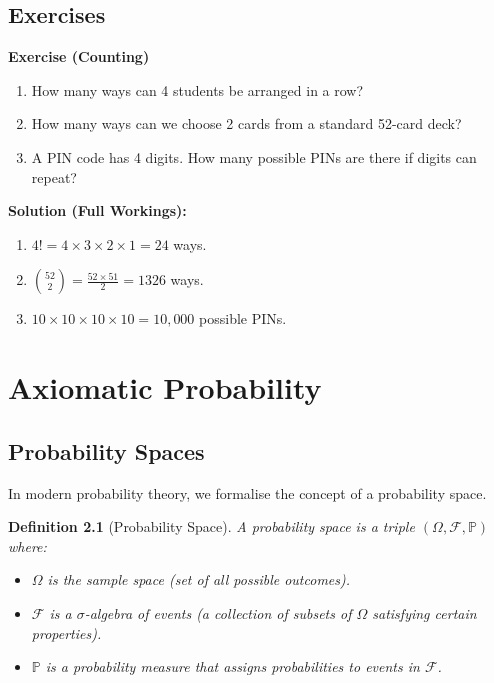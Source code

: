 \documentclass[12pt,a4paper,oneside]{report}
\theoremstyle{mytheorem}
\theoremstyle{mydefinition}
\newtheorem{definition}[theorem]{Definition}
\theoremstyle{myremark}
\newenvironment{exercise}[1]{%
  \par\medskip\noindent\textbf{\color{myblue}Exercise (#1)}\par\smallskip
}{%
  \par\smallskip
}
\newenvironment{solution}{%
  \par\noindent\textbf{\color{mygreen}Solution (Full Workings):}\par\smallskip
}{%
  \par\bigskip
}
\newcommand{\Prob}{\mathbb{P}}
\begin{document}
\section{Exercises}
\begin{exercise}{Counting}
\begin{enumerate}[label=(\alph*)]
    \item How many ways can 4 students be arranged in a row?
    \item How many ways can we choose 2 cards from a standard 52-card deck?
    \item A PIN code has 4 digits. How many possible PINs are there if digits can repeat?
\end{enumerate}
\end{exercise}

\begin{solution}
\begin{enumerate}[label=(\alph*)]
    \item $4! = 4 \times 3 \times 2 \times 1 = 24$ ways.
    \item $\binom{52}{2} = \frac{52 \times 51}{2} = 1326$ ways.
    \item $10 \times 10 \times 10 \times 10 = 10,000$ possible PINs.
\end{enumerate}
\end{solution}

\chapter{Axiomatic Probability}

\section{Probability Spaces}
In modern probability theory, we formalise the concept of a probability space.

\begin{definition}[Probability Space]
A probability space is a triple $(\Omega, \mathcal{F}, \Prob)$ where:
\begin{itemize}
    \item $\Omega$ is the sample space (set of all possible outcomes).
    \item $\mathcal{F}$ is a $\sigma$-algebra of events (a collection of subsets of $\Omega$ satisfying certain properties).
    \item $\Prob$ is a probability measure that assigns probabilities to events in $\mathcal{F}$.
\end{itemize}
\end{definition}
\end{document}
